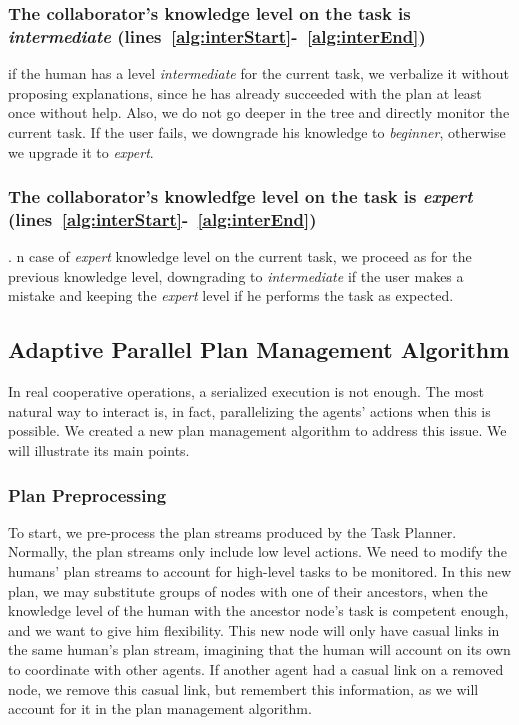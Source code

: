 \subsubsection{The collaborator's knowledge level on the task is \textit{intermediate} (lines~\ref{alg:interStart}-~\ref{alg:interEnd})} if the human has a level \textit{intermediate} for the current task, we verbalize it without proposing explanations, since he has already  succeeded with the plan at least once without help. Also, we do not go deeper in the tree and directly monitor the current task. If the user  fails, we downgrade his knowledge to \textit{beginner}, otherwise we upgrade it to \textit{expert}.

\subsubsection{The collaborator's knowledfge level on the task is \textit{expert} (lines~\ref{alg:interStart}-~\ref{alg:interEnd})}. n case of \textit{expert} knowledge level on the current task, we  proceed as for the previous knowledge level, downgrading to \textit{intermediate} if the user makes a mistake and keeping the \textit{expert} level if he performs the task as expected.


\subsection{Adaptive Parallel Plan Management Algorithm}
In real cooperative operations, a serialized execution is not enough. The most natural way to interact is, in fact, parallelizing the agents' actions when this is possible. We created a new plan management algorithm to address this issue. We will illustrate its main points.

\subsubsection{Plan Preprocessing}
To start, we pre-process the plan streams produced by the Task Planner. Normally, the plan streams only include low level actions. We need to  modify the humans' plan streams to account for high-level tasks to be monitored. In this new plan, we may substitute groups of nodes with one of their ancestors, when the knowledge level of the human with the ancestor node's task is competent enough, and we want to give him flexibility. This new node will only have casual links in the same human's plan stream, imagining that the human will account on its own to coordinate with other agents. If another agent had a casual link on a removed node, we remove this casual link, but remembert this information, as we will account for it in the plan management algorithm.

